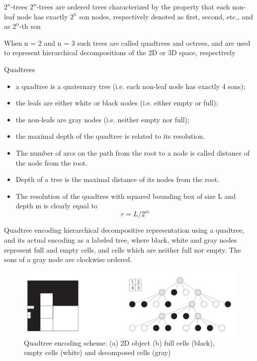 \begin{frame}{$2^n$-trees}
$2^n$-trees are ordered trees characterized by the property that each non-leaf
node has exactly $2^n$ son nodes, respectively denoted as first, second, etc.,
and as $2^n$-th son


When n = 2 and n = 3 such trees are called quadtrees and octrees, and are
used to represent hierarchical decompositions of the 2D or 3D space,
respectively

\end{frame}

\begin{frame}{Quadtrees}
\begin{itemize}
    \item a quadtree is a quaternary tree (i.e. each non-leaf node has exactly 4
sons);
    \item the leafs are either white or black nodes (i.e. either empty or full);
    \item the non-leafs are gray nodes (i.e. neither empty nor full);
    \item the maximal depth of the quadtree is related to its resolution.
    \item The number of arcs on the path from the root to a node is called
distance of the node from the root.
    \item Depth of a tree is the maximal distance of its nodes from the root.
    \item The resolution of the quadtree with squared bounding box of size L
and depth m is clearly equal to
\[
r=L/2^m
\]
\end{itemize}
    
\end{frame}


\begin{frame}{Quadtree encoding}
hierarchical decompositive representation using a quadtree, and its actual
encoding as a labeled tree, where black, white and gray nodes represent full
and empty cells, and cells which are neither full nor empty.
The sons of a gray node are clockwise ordered.

\begin{figure}
    \centering
    \includegraphics[width=\textwidth]{figs/L17-quad-tree.png}
    \caption{Quadtree encoding scheme: (a) 2D object (b) full cells (black), empty
cells (white) and decomposed cells (gray)}
\end{figure}


    
\end{frame}

